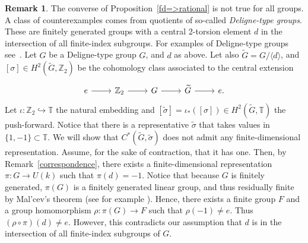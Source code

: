 \documentclass{amsart}
\theoremstyle{definition}
\newtheorem{remark}[theorem]{Remark}
\newcommand{\Z}{\mathbb{Z}}
\newcommand{\TT}{\mathbb{T}}
\begin{document}
\begin{remark}
The converse of Proposition~\ref{fd=>rational} is not true for all groups. A class of counterexamples comes from quotients of so-called {\em Deligne-type groups}. These are finitely generated groups with a central 2-torsion element $d$ in the intersection of all finite-index subgroups. For examples of Deligne-type groups see~\cite[section 5]{Deligne,hillnonrf, RFstover,nonaproximable}. Let $G$ be a Deligne-type group $G$, and $d$ as above. Let also $\widetilde{G}=G/\langle d\rangle$, and $[\sigma]\in H^2(\widetilde{G}, \Z_2)$ be the cohomology class associated to the central extension 
$$\begin{tikzcd}
e\arrow{r}&\Z_2\arrow{r}&G\arrow{r}&\widetilde{G}\arrow{r}&e.
\end{tikzcd}$$
Let $\iota:\Z_2\hookrightarrow \TT$ the natural embedding and $[\widetilde{\sigma}]=\iota_*([\sigma])\in H^2(\widetilde{G},\TT)$ the push-forward. Notice that there is a representative $\widetilde{\sigma}$ that takes values in $\{1,-1\}\subset \TT$. We will show that $C^*(\widetilde{G},\widetilde{\sigma})$ does not admit any finite-dimensional representation. Assume, for the sake of contraction, that it has one. Then, by Remark~\ref{correspondence}, there exists a finite-dimensional representation $\pi:G\to U(k)$ such that $\pi(d)=-1$. Notice that because $G$ is finitely generated, $\pi(G)$ is a finitely generated linear group, and thus residually finite by Mal'cev's theorem (see for example \cite[Theorem 6.4.13]{brownozawa}). Hence, there exists a finite group $F$ and a group homomorphism $\rho:\pi(G)\to F$ such that $\rho(-1)\neq e$. Thus $(\rho\circ \pi)(d)\neq e$. However, this contradicts our assumption that $d$ is in the intersection of all finite-index subgroups of $G$.


\end{remark}
\end{document}

